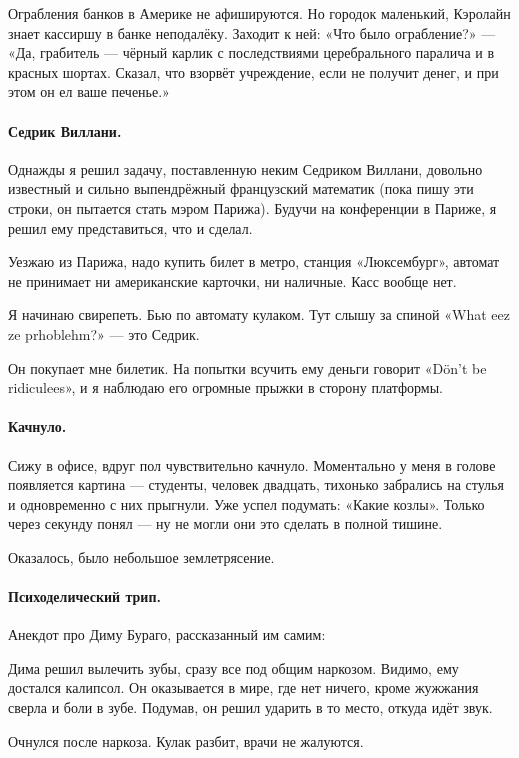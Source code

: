 \documentclass{book}
\begin{document}
Ограбления банков в Америке не афишируются.
Но городок маленький, Кэролайн знает кассиршу в банке неподалёку.
Заходит к ней: «Что было ограбление?» --- «Да, грабитель --- чёрный карлик с последствиями церебрального паралича и в красных шортах. Сказал, что взорвёт учреждение, если не получит денег, и
при этом он ел ваше печенье.»

\paragraph{Седрик Виллани.}
Однажды я решил задачу, поставленную неким Седриком Виллани, довольно известный и сильно выпендрёжный французский математик (пока пишу эти строки, он пытается стать мэром Парижа).
Будучи на конференции в Париже, я решил ему представиться, что и сделал.

Уезжаю из Парижа, надо купить билет в метро, станция «Люксембург»,
автомат не принимает ни американские карточки, ни наличные.
Касс вообще нет.

Я начинаю свирепеть.
Бью по автомату кулаком.
Тут слышу за спиной «What eez ze prhoblehm?» --- это Седрик.

Он покупает мне билетик.
На попытки всучить ему деньги говорит «D\"{o}n't be ridiculees», и я наблюдаю его огромные прыжки в сторону платформы.

\paragraph{Качнуло.}
Сижу в офисе, вдруг пол чувствительно качнуло.
Моментально у меня в голове появляется картина --- студенты, человек двадцать, тихонько забрались на стулья и одновременно с них прыгнули.
Уже успел подумать: «Какие козлы».
Только через секунду понял --- ну не могли они это сделать в полной тишине.

Оказалось, было небольшое землетрясение.

\paragraph{Психоделический трип.}
Анекдот про Диму Бураго, рассказанный им самим:

Дима решил вылечить зубы, сразу все под общим наркозом.
Видимо, ему достался калипсол.
Он оказывается в мире, где нет ничего, кроме жужжания сверла и боли в зубе.
Подумав, он решил ударить в то место, откуда идёт звук.

Очнулся после наркоза.
Кулак разбит, врачи не жалуются.
\end{document}
